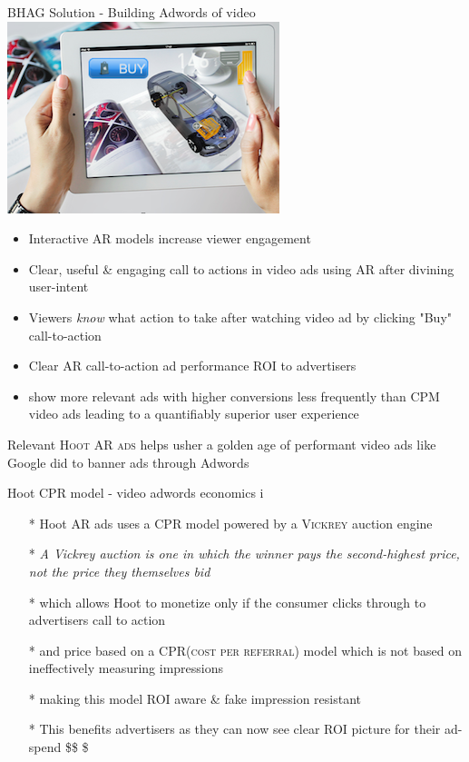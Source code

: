 \documentclass[11pt,handout]{beamer}
\begin{document}
\begin{frame}[fragile]{BHAG Solution - Building Adwords of video \includegraphics[scale=.1]{static/arad/arad5} }
\begin{itemize}[<+-| alert@+>]
\item Interactive AR models increase viewer engagement
\item Clear, useful \& engaging call to actions in video ads using AR after divining user-intent
\item Viewers \emph{know} what action to take after watching video ad by clicking "Buy" call-to-action
\item Clear AR call-to-action ad performance \textsc{ROI} to advertisers 
\item show more relevant ads with higher conversions less frequently than CPM video ads leading to a quantifiably superior user experience 
\end{itemize}
\pause
Relevant \textsc{Hoot AR ads} helps usher a golden age of performant video ads like Google did to banner ads through Adwords


\end{frame}

\begin{frame}[t]{Hoot CPR model - video adwords economics i}
\begin{itemize}[<+-| alert@+>]
\item[*] Hoot AR ads uses a CPR model powered by a \textsc{Vickrey} auction engine
\item[*]\emph{A Vickrey auction is one in which the winner pays the second-highest price, not the price they themselves bid}
\item[*]which allows Hoot to monetize only if the consumer clicks through to advertisers call to action
\item[*]and price based on a \textsc{CPR(cost per referral)} model which is not based on ineffectively measuring impressions
\item[*]making this model ROI aware \& fake impression resistant
\item[*]This benefits advertisers as they can now see clear ROI picture for their ad-spend \$\$ \$
\end{itemize}
\end{frame}
\end{document}
